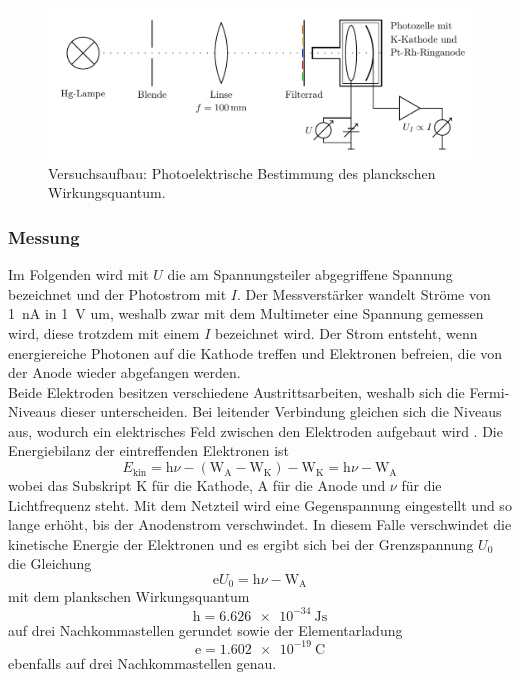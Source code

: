 \begin{figure}[htb]
	\centering
	\includegraphics[width=0.8\linewidth]{../figs/photozelle_optikbank}
	\caption{Versuchsaufbau: Photoelektrische Bestimmung des planckschen Wirkungsquantum.
	\cite[S.19]{skript}}
	\label{fig:photozelle_optikbank}
\end{figure}

\subsubsection{Messung}
Im Folgenden wird mit $U$ die am Spannungsteiler abgegriffene Spannung bezeichnet und der Photostrom
mit $I$. Der Messverstärker wandelt Ströme von \SI{1}{\nano\ampere} in \SI{1}{\volt} um,
weshalb zwar mit dem Multimeter eine Spannung gemessen wird, diese trotzdem mit einem $I$ bezeichnet
wird. Der Strom entsteht, wenn energiereiche Photonen auf die Kathode treffen und
Elektronen befreien, die von der Anode wieder abgefangen werden.\\
Beide Elektroden besitzen verschiedene Austrittsarbeiten, weshalb sich die Fermi-Niveaus
dieser unterscheiden. Bei leitender Verbindung gleichen sich die Niveaus aus, wodurch
ein elektrisches Feld zwischen den Elektroden aufgebaut wird
\cite{wiki:kontaktpotential}. 
Die Energiebilanz der eintreffenden
Elektronen ist
\begin{equation}
	E_\mathrm{kin} = \mathrm h\nu - (\mathrm W_{\mathrm A} - \mathrm W_{\mathrm K})
	- \mathrm W_{\mathrm K} = \mathrm h\nu - \mathrm W_{\mathrm A}\nonumber
\end{equation}
wobei das Subskript K für die Kathode, A für die Anode und $\nu$ für die Lichtfrequenz steht.
Mit dem Netzteil wird eine Gegenspannung eingestellt und so lange erhöht, bis
der Anodenstrom verschwindet. In diesem Falle verschwindet die kinetische Energie der Elektronen
und es ergibt sich bei der Grenzspannung $U_0$ die Gleichung
\begin{equation}
	\mathrm eU_0 = \mathrm h\nu - \mathrm W_{\mathrm A}
	\label{eq:gegenfeldmethode}
\end{equation}
mit dem plankschen Wirkungsquantum\cite[S.75]{Demtröder:829119} 
$$\mathrm h=\SI{6.626e-34}{\joule\second}$$ 
auf drei Nachkommastellen gerundet sowie der Elementarladung\cite[S.29]{Demtröder:829119}
\[\mathrm e = \SI{1.602e-19}{\coulomb}\]
ebenfalls auf drei Nachkommastellen genau.


